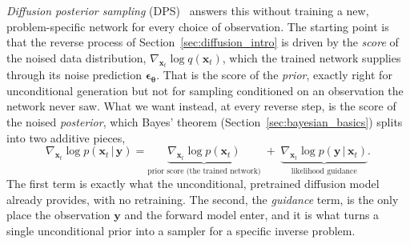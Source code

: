 \emph{Diffusion posterior sampling} (DPS)~\citep{chung_diffusion_2023} answers this without training a new, problem-specific network for every choice of observation. The starting point is that the reverse process of Section~\ref{sec:diffusion_intro} is driven by the \emph{score} of the noised data distribution, $\nabla_{\bm{x}_t}\log q(\bm{x}_t)$, which the trained network supplies through its noise prediction $\bm{\epsilon}_{\bm{\theta}}$. That is the score of the \emph{prior}, exactly right for unconditional generation but not for sampling conditioned on an observation the network never saw. What we want instead, at every reverse step, is the score of the noised \emph{posterior}, which Bayes' theorem (Section~\ref{sec:bayesian_basics}) splits into two additive pieces,
\begin{equation}
    \nabla_{\bm{x}_t}\log p(\bm{x}_t\,|\,\bm{y}) = \underbrace{\nabla_{\bm{x}_t}\log p(\bm{x}_t)}_{\text{prior score (the trained network)}} \;+\; \underbrace{\nabla_{\bm{x}_t}\log p(\bm{y}\,|\,\bm{x}_t)}_{\text{likelihood guidance}}.
    \label{eq:dps_score_decomposition}
\end{equation}
The first term is exactly what the unconditional, pretrained diffusion model already provides, with no retraining. The second, the \emph{guidance} term, is the only place the observation $\bm{y}$ and the forward model enter, and it is what turns a single unconditional prior into a sampler for a specific inverse problem.

